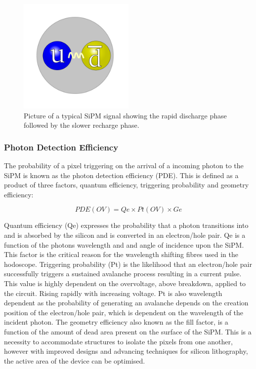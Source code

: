 \begin{figure}[!ht]
	\centering
	\includegraphics[width=0.5\textwidth]{ImgChap1/Meson2}
	\caption{Picture of a typical SiPM signal showing the rapid discharge phase followed by the slower recharge phase.}
	\label{SiPMDischargeRecharge}
\end{figure}

\subsubsection*{Photon Detection Efficiency}

The probability of a pixel triggering on the arrival of a incoming photon to the SiPM is known as the photon detection efficiency (PDE). This is defined as a product of three factors, quantum efficiency, triggering probability and geometry efficiency: 

\[ PDE(OV) = Qe \times Pt(OV) \times Ge \]

Quantum efficiency (Qe) expresses the probability that a photon transitions into and is absorbed by the silicon and is converted in an electron/hole pair. Qe is a function of the photons wavelength and and angle of incidence upon the SiPM. This factor is the critical reason for the wavelength shifting fibres used in the hodoscope. Triggering probability (Pt) is the likelihood that an electron/hole pair successfully triggers a sustained avalanche process resulting in a current pulse. This value is highly dependent on the overvoltage, above breakdown, applied to the circuit. Rising rapidly with increasing voltage. Pt is also wavelength dependent as the probability of generating an avalanche depends on the creation position of the electron/hole pair, which is dependent on the wavelength of the incident photon. The geometry efficiency also known as the fill factor, is a function of the amount of dead area present on the surface of the SiPM. This is a necessity to accommodate structures to isolate the pixels from one another, however with improved designs and advancing techniques for silicon lithography, the active area of the device can be optimised.

